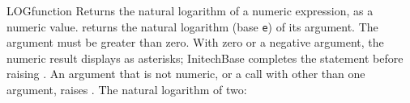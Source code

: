 \begin{XbaseEntry}{LOG}{function}
Returns the natural logarithm of a numeric expression, as a numeric value.
\Syntax
{}
\Usage
{} returns the natural logarithm (base \texttt{e}) of its argument.
The argument must be greater than zero. With zero or a negative argument,
the numeric result displays as asterisks; InitechBase completes the statement
before raising .
An argument that is not numeric, or a call with other than one argument,
raises .
\Examples
The natural logarithm of two:
\end{XbaseEntry}

